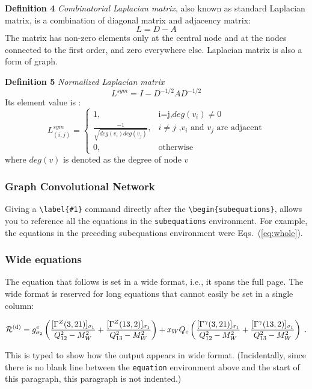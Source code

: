 \documentclass[%
reprint,
amsmath,amssymb,
aps,
]{revtex4-2}
\begin{document}
	\textbf{Definition 4} \textit{Combinatorial Laplacian matrix}, also known as standard Laplacian matrix, is a combination of diagonal matrix and adjacency matrix:
	\begin{equation}
		L = D - A
	\end{equation}
	The matrix has non-zero elements only at the central node and at the nodes connected to the first order, and zero everywhere else. Laplacian matrix is also a form of graph.
	
	\textbf{Definition 5} \textit{Normalized Laplacian matrix}
	\begin{equation}
		L^{sym} = I - D^{-1/2}AD^{-1/2}
	\end{equation}
	Its element value is :
	\begin{equation}
		L^{sym}_{(i,j)} = 
		\begin{cases}
			1,& \text{i=j,$deg(v_i)\ne0$} \\
			\frac {-1}{\sqrt{deg(v_i)deg(v_j)}},& \text{${i}\ne{j}$ ,$v_i$ and $v_j$ are adjacent}\\
			0,& \text{otherwise}
		\end{cases}
	\end{equation}
	where $deg(v)$ is denoted as the degree of node $v$
	\subsubsection{Graph Convolutional Network}
	Giving a \verb+\label{#1}+ command directly after the \verb+\begin{subequations}+, 
		allows you to reference all the equations in the \texttt{subequations} environment. 
		For example, the equations in the preceding subequations environment were
		Eqs.~(\ref{eq:whole}).
		
		\subsubsection{Wide equations}
		The equation that follows is set in a wide format, i.e., it spans the full page. 
		The wide format is reserved for long equations
		that cannot easily be set in a single column:
		\begin{widetext}
			\begin{equation}
				{\cal R}^{(\text{d})}=
				g_{\sigma_2}^e
				\left(
				\frac{[\Gamma^Z(3,21)]_{\sigma_1}}{Q_{12}^2-M_W^2}
				+\frac{[\Gamma^Z(13,2)]_{\sigma_1}}{Q_{13}^2-M_W^2}
				\right)
				+ x_WQ_e
				\left(
				\frac{[\Gamma^\gamma(3,21)]_{\sigma_1}}{Q_{12}^2-M_W^2}
				+\frac{[\Gamma^\gamma(13,2)]_{\sigma_1}}{Q_{13}^2-M_W^2}
				\right)\;. 
				\label{eq:wideeq}
			\end{equation}
		\end{widetext}
		This is typed to show how the output appears in wide format.
		(Incidentally, since there is no blank line between the \texttt{equation} environment above 
		and the start of this paragraph, this paragraph is not indented.)
		
\end{document}
